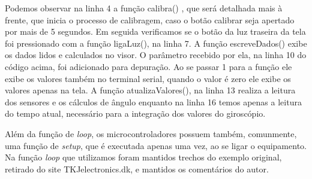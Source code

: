 \documentclass[a4paper,12pt]{article}
\begin{document}
Podemos observar na linha 4 a função calibra() , que será detalhada mais à frente, que inicia o processo de calibragem, caso o botão calibrar seja apertado por mais de 5 segundos. Em seguida verificamos se o botão da luz traseira da tela foi pressionado com a função ligaLuz(), na linha 7. A função escreveDados() exibe os dados lidos e calculados no visor. O parâmetro recebido por ela, na linha 10 do código acima, foi adicionado para depuração. Ao se passar 1 para a função ele exibe os valores também no terminal serial, quando o valor é zero ele exibe os valores apenas na tela. A função atualizaValores(), na linha 13 realiza a leitura dos sensores e os cálculos de ângulo enquanto na linha 16 temos apenas a leitura do tempo atual, necessário para a integração dos valores do giroscópio.

Além da função de \textit{loop}, os microcontroladores possuem também, comunmente, uma função de \textit{setup}, que é executada apenas uma vez, ao se ligar o equipamento. Na função \textit{loop} que utilizamos foram mantidos trechos do exemplo original, retirado do site TKJelectronics.dk, e mantidos os comentários do autor.
\end{document}
